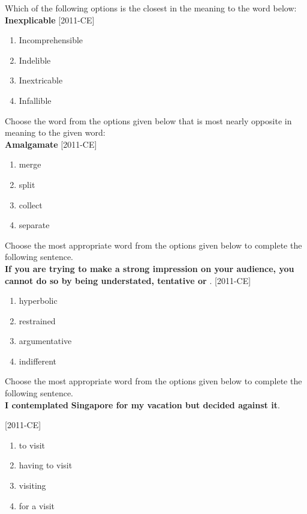 \item Which of the following options is the closest in the meaning to the word below:\\
\textbf{Inexplicable} \hfill{[2011-CE]}\\
\begin{enumerate}
    \item Incomprehensible
    \item Indelible
    \item Inextricable
    \item Infallible
\end{enumerate}
\item Choose the word from the options given below that is most nearly opposite in meaning to the given word:\\
\textbf{Amalgamate} \hfill{[2011-CE]}\\
\begin{enumerate}
    \item merge
    \item split
    \item collect
    \item separate
\end{enumerate}
\item Choose the most appropriate word from the options given below to complete the following sentence.\\
\textbf{If you are trying to make a strong impression on your audience, you cannot do so by being understated, tentative or} \underline{\hspace{1cm}}. \hfill{[2011-CE]}\\
\begin{enumerate}
    \item hyperbolic
    \item restrained
    \item argumentative
    \item indifferent
\end{enumerate}
\item Choose the most appropriate word from the options given below to complete the following sentence.\\
\textbf{I contemplated} \underline{\hspace{1cm}} \textbf{Singapore for my vacation but decided against it}. 

    \hfill{[2011-CE]}
\begin{enumerate}
    \item to visit
    \item having to visit
    \item visiting
    \item for a visit
\end{enumerate}


